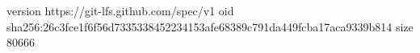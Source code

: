 version https://git-lfs.github.com/spec/v1
oid sha256:26c3fce1f6f56d7335338452234153afe68389c791da449fcba17aca9339b814
size 80666
